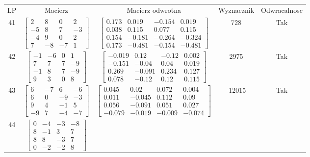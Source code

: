 \documentclass[a4paper,12pt]{article}
\begin{document}
\bgroup {} \vspace{0.2in} \begin{tabular}{c c c c c}
LP & Macierz & Macierz odwrotna & Wyznacznik & Odwracalnosc\\
41
&
$\begin{bmatrix} 2 & 8 & 0 & 2 \\ -5 & 8 & 7 & -3 \\ -4 & 9 & 0 & 2 \\ 7 & -8 & -7 & 1 \end{bmatrix}$
&
$\begin{bmatrix} 0.173 & 0.019 & -0.154 & 0.019 \\ 0.038 & 0.115 & 0.077 & 0.115 \\ 0.154 & -0.181 & -0.264 & -0.324 \\ 0.173 & -0.481 & -0.154 & -0.481 \end{bmatrix}$
&
728
&
Tak
\\
42
&
$\begin{bmatrix} -1 & -6 & 0 & 1 \\ 7 & 7 & 7 & -9 \\ -1 & 8 & 7 & -9 \\ 9 & 3 & 0 & 8 \end{bmatrix}$
&
$\begin{bmatrix} -0.019 & 0.12 & -0.12 & 0.002 \\ -0.151 & -0.04 & 0.04 & 0.019 \\ 0.269 & -0.091 & 0.234 & 0.127 \\ 0.078 & -0.12 & 0.12 & 0.115 \end{bmatrix}$
&
2975
&
Tak
\\
43
&
$\begin{bmatrix} 6 & -7 & 6 & -6 \\ 6 & 0 & -9 & -3 \\ 9 & 4 & -1 & 5 \\ -9 & 7 & -4 & -7 \end{bmatrix}$
&
$\begin{bmatrix} 0.045 & 0.02 & 0.072 & 0.004 \\ 0.011 & -0.045 & 0.112 & 0.09 \\ 0.056 & -0.091 & 0.051 & 0.027 \\ -0.079 & -0.019 & -0.009 & -0.074 \end{bmatrix}$
&
-12015
&
Tak
\\
44
&
$\begin{bmatrix} 0 & -4 & -3 & -8 \\ 8 & -1 & 3 & 7 \\ 8 & 8 & -3 & 7 \\ 0 & -2 & -2 & 8 \end{bmatrix}$

\end{tabular}
\end{document}
